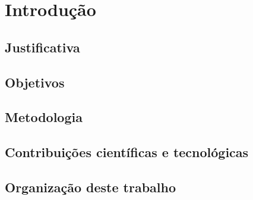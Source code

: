 \chapter{Introdução}
\label{cap:introducao}


\section{Justificativa}



\section{Objetivos}

\section{Metodologia}

\section{Contribuições científicas e tecnológicas}



\section{Organização deste trabalho}

